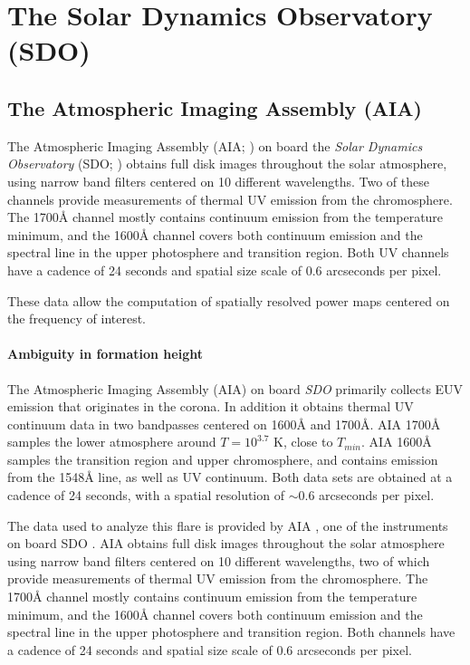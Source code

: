 \section{The Solar Dynamics Observatory (SDO)}

\subsection{The Atmospheric Imaging Assembly (AIA)}

The Atmospheric Imaging Assembly (AIA; \cite{Lemen2012}) on board the
\textit{Solar Dynamics Observatory} (SDO; \cite{Pesnell2012})
obtains full disk images throughout the solar atmosphere,
using narrow band filters centered on 10 different wavelengths.
Two of these channels provide measurements of
thermal UV emission from the chromosphere.
The 1700\AA{} channel mostly contains continuum emission from the
temperature minimum, and
the 1600\AA{} channel covers
both continuum emission and the  spectral line in the upper
photosphere and transition region.
Both UV channels have a cadence of
24 seconds and spatial size scale of 0.6 arcseconds per pixel.

These data allow the computation of spatially resolved power maps centered
on the frequency of interest.

\paragraph{Ambiguity in formation height}


The Atmospheric Imaging Assembly (AIA) \citep{Lemen2012, Boerner2012}
on board \textit{SDO} primarily collects EUV emission
that originates in the corona.
In addition it obtains thermal UV continuum data in
two bandpasses centered on 1600\AA{} and 1700\AA{}. AIA 1700\AA{} samples the
lower atmosphere around $T = 10^{3.7}$ K, close to $T_{min}$. AIA 1600\AA{}
samples the transition region and upper chromosphere, and contains emission
from the  1548\AA{} line, as well as UV continuum. Both data sets
are obtained at a cadence of 24 seconds, with a spatial resolution of $\sim$0.6
arcseconds per pixel.

The data used to analyze this flare is provided by
AIA \citep{Lemen2012},
one of the instruments on board
SDO \citep{Pesnell2012}.
AIA obtains full disk images throughout the solar atmosphere using narrow band
filters centered on 10 different wavelengths, two of which provide measurements
of thermal UV emission from the chromosphere.
The 1700\AA{} channel mostly contains
continuum emission from the temperature minimum, and the
1600\AA{} channel covers both continuum emission and the
 spectral line in the upper photosphere and transition region.
Both channels have a cadence of 24 seconds and
spatial size scale of 0.6 arcseconds per pixel.


